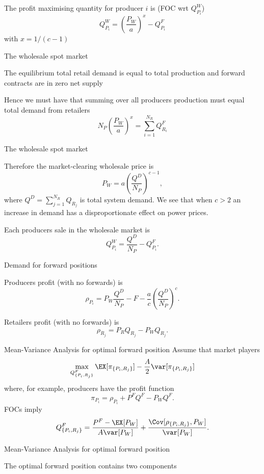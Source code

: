 	The profit maximising quantity for producer $i$ is (FOC wrt $Q_{P_i}^W$)
$$Q_{P_i}^W=\left(\frac{P_W}{a}\right)^{x}-Q_{P_i}^F$$
with $x=1/(c-1)$


{The wholesale spot market}


	The equilibrium total retail demand is equal to total production and forward contracts are in zero net supply

	Hence we must have that summing over all producers production must equal total demand from retailers
$$
N_P\left(\frac{P_W}{a}\right)^{x}=\sum_{i=1}^{N_R}Q_{R_i}^F
$$


{The wholesale spot market}


	Therefore the market-clearing wholesale price is
$$
P_W=a \left(\frac{Q^D}{N_P}\right)^{c-1},$$
where $Q^D=\sum_{j=1}^{N_R}Q_{R_j}$ is total system demand. We see that when $c>2$ an increase in demand has a disproportionate effect on power prices.

	Each producers sale in the wholesale market is
$$
Q_{P_i}^W= \frac{Q^D}{N_P}-Q_{P_i}^F.
$$


{Demand for forward positions}


	Producers profit (with no forwards) is
$$
\rho_{P_i}=P_W\frac{Q^D}{N_P}-F-\frac{a}{c}\left(\frac{Q^D}{N_P}\right)^{c}.$$

	Retailers profit (with no forwards) is
$$
\rho_{R_j}=P_RQ_{R_j}-P_WQ_{R_j}.
$$


{Mean-Variance Analysis for optimal forward position}
Assume that market players
$$
\max_{Q^F_{\{P_i,R_j\}}}\EX[\pi_{\{P_i,R_j\}}]-\frac{A}{2}\var[\pi_{\{P_i,R_j\}}]
$$
where, for example, producers have the profit function
$$
\pi_{P_i}=\rho_{P_i}+ P^FQ^F-P_WQ^F.
$$
FOCs imply
$$
Q^F_{\{P_i,R_j\}}= \frac{P^F-\EX[P_W]}{A\var[P_W]}+\frac{\Cov[\rho_{\{P_i,R_j\}},P_W]}{\var[P_W]}.
$$

{Mean-Variance Analysis for optimal forward position}


	The optimal forward position contains two components



